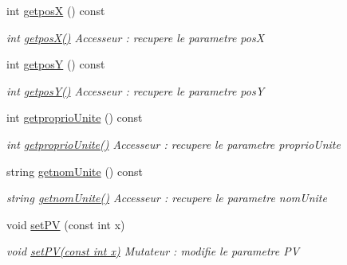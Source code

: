 \begin{DoxyCompactItemize}
\mbox{\label{classUnite_ac47d35a8e9090fb687cca793f9ed9cb4}} 
int \hyperlink{classUnite_ac47d35a8e9090fb687cca793f9ed9cb4}{getposX} () const
\begin{DoxyCompactList}\small\item\em int \hyperlink{classUnite_ac47d35a8e9090fb687cca793f9ed9cb4}{getpos\+X()} Accesseur \+: recupere le parametre posX \end{DoxyCompactList}\item 
\mbox{\label{classUnite_a8bfc553042438d4cedd483ba536ee853}} 
int \hyperlink{classUnite_a8bfc553042438d4cedd483ba536ee853}{getposY} () const
\begin{DoxyCompactList}\small\item\em int \hyperlink{classUnite_a8bfc553042438d4cedd483ba536ee853}{getpos\+Y()} Accesseur \+: recupere le parametre posY \end{DoxyCompactList}\item 
\mbox{\label{classUnite_add7c6ac61de68d8b2cc9bafdaab62daf}} 
int \hyperlink{classUnite_add7c6ac61de68d8b2cc9bafdaab62daf}{getproprio\+Unite} () const
\begin{DoxyCompactList}\small\item\em int \hyperlink{classUnite_add7c6ac61de68d8b2cc9bafdaab62daf}{getproprio\+Unite()} Accesseur \+: recupere le parametre proprio\+Unite \end{DoxyCompactList}\item 
\mbox{\label{classUnite_acafd8081c6d38b6443da012fb14334bf}} 
string \hyperlink{classUnite_acafd8081c6d38b6443da012fb14334bf}{getnom\+Unite} () const
\begin{DoxyCompactList}\small\item\em string \hyperlink{classUnite_acafd8081c6d38b6443da012fb14334bf}{getnom\+Unite()} Accesseur \+: recupere le parametre nom\+Unite \end{DoxyCompactList}\item 
void \hyperlink{classUnite_af01fbd734f8dae8ae537335a0eb662c3}{set\+PV} (const int x)
\begin{DoxyCompactList}\small\item\em void \hyperlink{classUnite_af01fbd734f8dae8ae537335a0eb662c3}{set\+P\+V(const int x)} Mutateur \+: modifie le parametre PV \end{DoxyCompactList}\item 

\end{DoxyCompactItemize}
